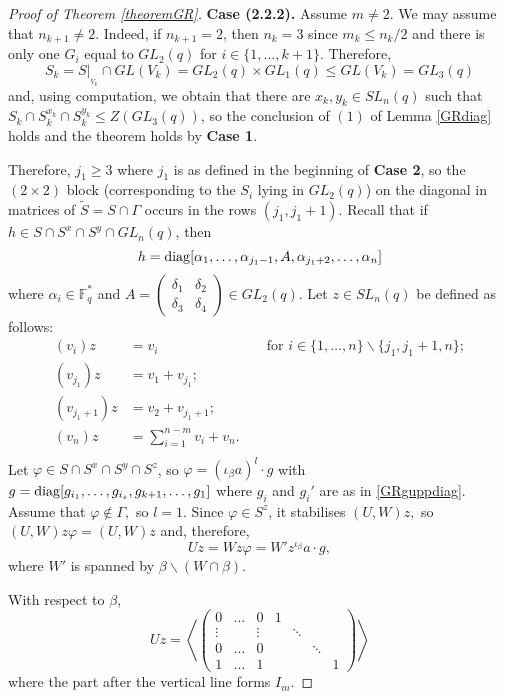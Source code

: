 \begin{proof}[Proof of Theorem {\rm \ref{theoremGR}}]
 \medskip
 
 {\bf Case (2.2.2).} Assume $m\ne 2.$  
  We may assume that $n_{k+1}\ne 2$. Indeed, if $n_{k+1}=2$, then  $n_{k}=3$ since $m_k\le n_k/2$ and there is only one $G_i$ equal to $GL_2(q)$ for $i \in \{1, \ldots, k+1\}.$ Therefore, $$S_k=S|_{_{V_k}}\cap GL(V_k)=GL_2(q) \times GL_1(q) \le GL(V_k)=GL_3(q)$$ and, using computation, we obtain that  there are $x_k, y_k \in SL_n(q)$ such that $S_k \cap S_k^{x_k} \cap S_k^{y_k} \le Z(GL_3(q))$, so the conclusion of  $(1)$ of Lemma \ref{GRdiag} holds and the theorem  holds by {\bf Case  1}. 
  
  Therefore, $j_1\ge 3$ where $j_1$ is as defined in the beginning of {\bf Case  2}, so the $(2 \times 2)$ block (corresponding to the $S_i$ lying in $GL_2(q)$) on the diagonal in matrices of $\tilde{S}=S \cap \Gamma$ occurs in the rows $(j_1, j_1+1)$. Recall that if $h \in  S \cap S^x \cap S^y \cap  GL_n(q)$, then $$h= \mathrm{diag}[\alpha_1, \ldots, \alpha_{j_1-1},A, \alpha_{j_1+2}, \ldots, \alpha_n]$$ where $\alpha_i \in \mathbb{F}_q^*$ and $A= \left( \begin{smallmatrix} \delta_1 & \delta_2 \\ \delta_3 & \delta_4  \end{smallmatrix} \right) \in GL_2(q).$ Let $z \in SL_n(q)$ be defined as follows:
\begin{equation}
\label{GRzdefcase222}
\begin{aligned}
(v_i)z & =  v_i &&\text{ for } i \in \{1, \ldots, n\} \backslash \{j_1, j_1+1, n\}; \\
(v_{j_1})z & =  v_1 + v_{j_1};\\
(v_{j_1+1})z & =  v_2 + v_{j_1+1};\\
(v_{n})z & =   \sum_{i=1}^{n-m} v_i   + v_{n}.\\
\end{aligned} 
\end{equation}
Let $\varphi \in S \cap S^x \cap S^y \cap S^z$, so $\varphi= (\iota_{\beta}a)^l \cdot g$ with $g=\mathrm{diag}[g_{i_1},\ldots, g_{i_s}, g_{k+1}, \ldots, g_1]$ where $g_i$ and $g_i'$ are as in \eqref{GRguppdiag}.  
 Assume that $\varphi \notin \Gamma,$ so $l=1.$ Since $\varphi \in S^z$, it stabilises $(U,W)z,$ so $(U,W)z \varphi =(U,W)z$ and, therefore, 
$$Uz=Wz \varphi = W'z^{\iota_{\beta}}a \cdot g,$$
where $W'$ is spanned by $\beta \backslash (W \cap \beta).$  

 With respect to $\beta$,
$$Uz= \left \langle 
\left(\begin{array}{ccc|ccccc}
 0        & \ldots & 0               &           1 & & &  \\
\vdots    &        &\vdots           &           & \ddots  & &  \\
0         & \ldots & 0               &            & &\ddots &  \\
1         & \ldots &  1              &           &  & & 1 
\end{array}\right)
\right \rangle$$
where the part after the vertical line forms $I_m.$


\end{proof}
